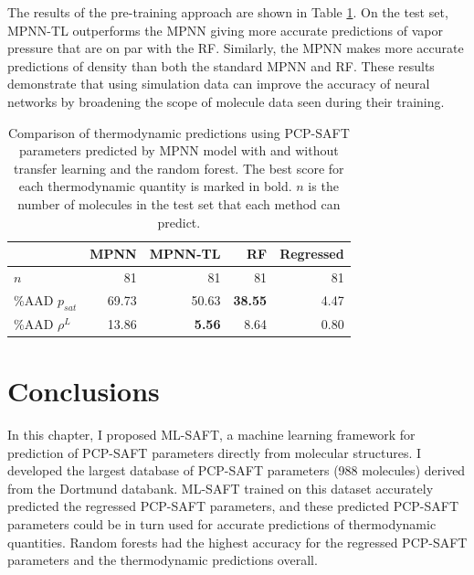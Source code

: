 The results of the pre-training approach are shown in Table \ref{tab:scores_tl}. On the test set, MPNN-TL outperforms the MPNN giving more accurate predictions of vapor pressure that are on par with the RF. Similarly, the MPNN makes more accurate predictions of density than both the standard MPNN and RF. These results demonstrate that using simulation data can improve the accuracy of neural networks by broadening the scope of molecule data seen during their training. 

\begin{table}
    \caption{Comparison of thermodynamic predictions using PCP-SAFT parameters predicted by MPNN model with and without transfer learning and the random forest. The best score for each thermodynamic quantity  is marked in bold. $n$ is the number of molecules in the test set that each method can predict.}
    \begin{center}
            \begin{tabular}{lrrr|r}
                & MPNN & MPNN-TL & RF & Regressed \\
                \hline
                $n$ & 81 & 81 & 81 & 81 \\
                \%AAD $p_{sat}$ & 69.73 & 50.63 & \textbf{38.55} & 4.47 \\
                \%AAD $\rho^{L}$ & 13.86 & \textbf{5.56} & 8.64 & 0.80 \\
                \hline
            \end{tabular}
    \end{center}
    \label{tab:scores_tl}
\end{table}

\section{Conclusions}

In this chapter, I proposed ML-SAFT, a machine learning framework for prediction of PCP-SAFT parameters directly from molecular structures. I developed the largest database of PCP-SAFT parameters (988 molecules) derived from the Dortmund databank. ML-SAFT trained on this dataset accurately predicted the regressed PCP-SAFT parameters, and these predicted PCP-SAFT parameters could be in turn used for accurate predictions of thermodynamic quantities. Random forests had the highest accuracy for the regressed PCP-SAFT parameters and the thermodynamic predictions overall.

